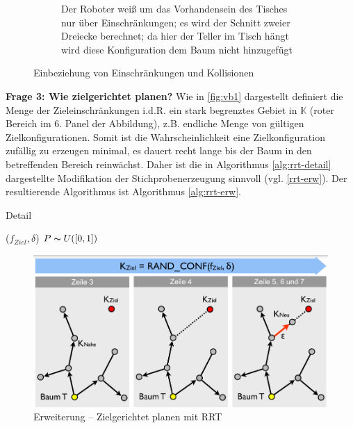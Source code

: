 \begin{figure}[h!]
\begin{subfigure}{.5\textwidth}
		\caption{Der Roboter \glqq weiß\grqq{} um das Vorhandensein des Tisches nur über Einschränkungen; es wird der Schnitt zweier Dreiecke berechnet; da hier der Teller im Tisch hängt wird diese Konfiguration dem Baum nicht hinzugefügt}
	\end{subfigure}
	\caption{Einbeziehung von Einschränkungen und Kollisionen}
	\label{fig:einschr}
\end{figure}
\textbf{Frage 3: Wie zielgerichtet planen?}
Wie in \autoref{fig:vb1} dargestellt definiert die Menge der Zieleinschränkungen i.d.R. ein stark begrenztes Gebiet in $\mathbb{K}$ (roter Bereich im 6. Panel der Abbildung), z.B. endliche Menge von gültigen Zielkonfigurationen. Somit ist die Wahrscheinlichkeit eine Zielkonfiguration zufällig zu erzeugen minimal, es dauert recht lange bis der Baum in den betreffenden Bereich reinwächst.
Daher ist die in Algorithmus \autoref{alg:rrt-detail} dargestellte Modifikation der Stichprobenerzeugung sinnvoll (vgl. \autoref{rrt-erw}). Der resultierende Algorithmus ist Algorithmus \ref{alg:rrt-erw}.\\
\begin{algorithm}
  \caption{Detail
    \label{alg:rrt-detail}}
  \begin{algorithmic}[1]
    ($f_{Ziel}, \delta$) 
      \State $P \thicksim U(\left[0,1\right])$
      	\State {}
      \Else
      	\State {}
      \EndIf
  \end{algorithmic}
\end{algorithm}
\begin{figure}[h!]
	\centering
	\includegraphics[width=.5\textwidth]{figures/ch04_rrt-erw.png}
	\caption{Erweiterung -- Zielgerichtet planen mit RRT}
	\label{rrt-erw}
\end{figure}
